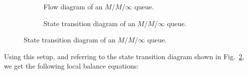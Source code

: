 \documentclass[11pt, a4paper]{report}
\begin{document}
\begin{figure}[ht]   
    \begin{subfigure}[b]{0.55\textwidth}
        \centering
        
        \caption{Flow diagram of an $M/M/\infty$ queue.}
        \label{fig:blk_mminfinite}
    \end{subfigure}
    \hfill
    \begin{subfigure}[b]{0.55\textwidth}
        \centering
        
        \caption{State transition diagram of an $M/M/\infty$ queue.}
        \label{fig:std_mminfinite}
    \end{subfigure}
    \label{fig:mminfinite_dig}
\end{figure}
Using this setup, and referring to the state transition diagram shown in Fig.~\ref{fig:std_mminfinite}, we get the following local balance equations:
\end{document}
